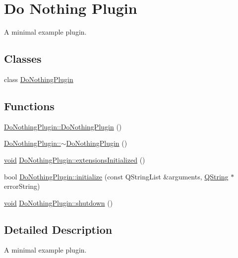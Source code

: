 \hypertarget{group___do_nothing_plugin}{\section{Do Nothing Plugin}
\label{group___do_nothing_plugin}
}


A minimal example plugin.  


\subsection*{Classes}
\begin{DoxyCompactItemize}
\item 
class \hyperlink{class_do_nothing_plugin}{Do\-Nothing\-Plugin}
\end{DoxyCompactItemize}
\subsection*{Functions}
\begin{DoxyCompactItemize}
\item 
\hyperlink{group___do_nothing_plugin_ga5a69c051df33ad86daa499ac440b9097}{Do\-Nothing\-Plugin\-::\-Do\-Nothing\-Plugin} ()
\item 
\hyperlink{group___do_nothing_plugin_gad61344cbd9fb9103b6e3b8f6da089030}{Do\-Nothing\-Plugin\-::$\sim$\-Do\-Nothing\-Plugin} ()
\item 
\hyperlink{group___u_a_v_objects_plugin_ga444cf2ff3f0ecbe028adce838d373f5c}{void} \hyperlink{group___do_nothing_plugin_ga82d133252a7e9bba0308a0a2674541f3}{Do\-Nothing\-Plugin\-::extensions\-Initialized} ()
\item 
bool \hyperlink{group___do_nothing_plugin_ga5038a5ac3f0abbd6c99a369d6d2ee9f4}{Do\-Nothing\-Plugin\-::initialize} (const Q\-String\-List \&arguments, \hyperlink{group___u_a_v_objects_plugin_gab9d252f49c333c94a72f97ce3105a32d}{Q\-String} $\ast$error\-String)
\item 
\hyperlink{group___u_a_v_objects_plugin_ga444cf2ff3f0ecbe028adce838d373f5c}{void} \hyperlink{group___do_nothing_plugin_gaa91993d8fa19262963650daf59993688}{Do\-Nothing\-Plugin\-::shutdown} ()
\end{DoxyCompactItemize}


\subsection{Detailed Description}
A minimal example plugin. 

